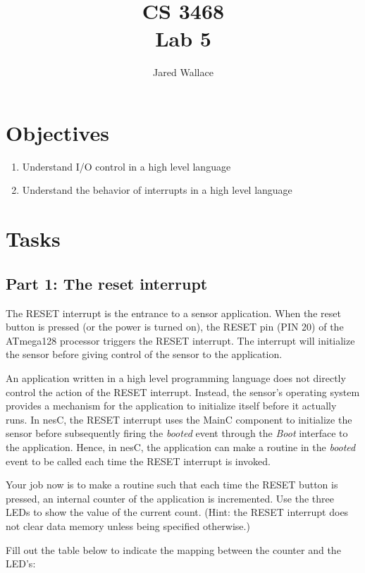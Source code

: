 \documentclass[letterpaper,12pt]{article}
\title{\Large CS 3468\\Lab 5}
\author{Jared Wallace}
\date{}
\begin{document}
\maketitle

\vspace{30mm}

\section*{Objectives}
\begin{enumerate}
\item Understand I/O control in a high level language
\item Understand the behavior of interrupts in a high level language
\end{enumerate}

\section*{Tasks}
\subsection*{Part 1: The reset interrupt}
The RESET interrupt is the entrance to a sensor application. When the reset button is pressed
(or the power is turned on), the RESET pin (PIN 20) of the ATmega128 processor triggers the 
RESET interrupt. The interrupt will initialize the sensor before giving control of the sensor
to the application.

An application written in a high level programming language does not directly control the action
of the RESET interrupt. Instead, the sensor's operating system provides a mechanism for the
application to initialize itself before it actually runs. In nesC, the RESET interrupt uses
the MainC component to initialize the sensor before subsequently firing the \emph{booted} event through
the \emph{Boot} interface to the application. Hence, in nesC, the application can make a routine in the
\emph{booted} event to be called each time the RESET interrupt is invoked.

Your job now is to make a routine such that each time the RESET button is pressed, an internal counter
of the application is incremented. Use the three LEDs to show the value of the current count.
(Hint: the RESET interrupt does not clear data memory unless being specified otherwise.)

Fill out the table below to indicate the mapping between the counter and the LED's:
\end{document}
